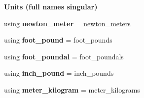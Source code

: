 \begin{Indent}{\bf Units (full names singular)}\par
\begin{DoxyCompactItemize}
\item 
\hypertarget{namespaceunits_1_1torque_a92e4788837487a1b68eed5b1f8a3863a}{}using {\bfseries newton\+\_\+meter} = \hyperlink{structunits_1_1unit}{newton\+\_\+meters}\label{namespaceunits_1_1torque_a92e4788837487a1b68eed5b1f8a3863a}

\item 
\hypertarget{namespaceunits_1_1torque_a6f8c6a32fc0801ed212689f0e323bc77}{}using {\bfseries foot\+\_\+pound} = foot\+\_\+pounds\label{namespaceunits_1_1torque_a6f8c6a32fc0801ed212689f0e323bc77}

\item 
\hypertarget{namespaceunits_1_1torque_a32fc1729bf9fb5fb2acf2c6657804f75}{}using {\bfseries foot\+\_\+poundal} = foot\+\_\+poundals\label{namespaceunits_1_1torque_a32fc1729bf9fb5fb2acf2c6657804f75}

\item 
\hypertarget{namespaceunits_1_1torque_a5655c73ad52a59600cbd34c0ec51d580}{}using {\bfseries inch\+\_\+pound} = inch\+\_\+pounds\label{namespaceunits_1_1torque_a5655c73ad52a59600cbd34c0ec51d580}

\item 
\hypertarget{namespaceunits_1_1torque_a7859cc43e4d4dfd0146badb708201e3a}{}using {\bfseries meter\+\_\+kilogram} = meter\+\_\+kilograms\label{namespaceunits_1_1torque_a7859cc43e4d4dfd0146badb708201e3a}

\end{DoxyCompactItemize}
\end{Indent}
